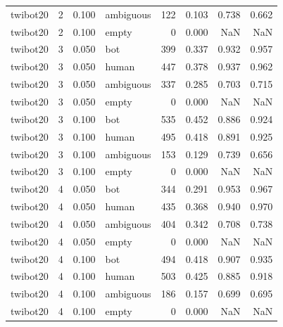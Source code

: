 \begin{tabular}{lrrlrrrr}
twibot20 & 2 & 0.100 & ambiguous & 122 & 0.103 & 0.738 & 0.662 \\
twibot20 & 2 & 0.100 & empty & 0 & 0.000 & NaN & NaN \\
twibot20 & 3 & 0.050 & bot & 399 & 0.337 & 0.932 & 0.957 \\
twibot20 & 3 & 0.050 & human & 447 & 0.378 & 0.937 & 0.962 \\
twibot20 & 3 & 0.050 & ambiguous & 337 & 0.285 & 0.703 & 0.715 \\
twibot20 & 3 & 0.050 & empty & 0 & 0.000 & NaN & NaN \\
twibot20 & 3 & 0.100 & bot & 535 & 0.452 & 0.886 & 0.924 \\
twibot20 & 3 & 0.100 & human & 495 & 0.418 & 0.891 & 0.925 \\
twibot20 & 3 & 0.100 & ambiguous & 153 & 0.129 & 0.739 & 0.656 \\
twibot20 & 3 & 0.100 & empty & 0 & 0.000 & NaN & NaN \\
twibot20 & 4 & 0.050 & bot & 344 & 0.291 & 0.953 & 0.967 \\
twibot20 & 4 & 0.050 & human & 435 & 0.368 & 0.940 & 0.970 \\
twibot20 & 4 & 0.050 & ambiguous & 404 & 0.342 & 0.708 & 0.738 \\
twibot20 & 4 & 0.050 & empty & 0 & 0.000 & NaN & NaN \\
twibot20 & 4 & 0.100 & bot & 494 & 0.418 & 0.907 & 0.935 \\
twibot20 & 4 & 0.100 & human & 503 & 0.425 & 0.885 & 0.918 \\
twibot20 & 4 & 0.100 & ambiguous & 186 & 0.157 & 0.699 & 0.695 \\
twibot20 & 4 & 0.100 & empty & 0 & 0.000 & NaN & NaN \\
\bottomrule
\end{tabular}
